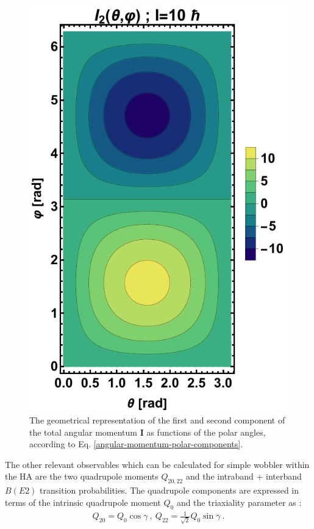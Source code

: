 \begin{figure}
    \includegraphics[scale=0.66]{Chapters/Figures/angular_components-TRM-2.pdf}
    \caption{The geometrical representation of the first and second component of the total angular momentum $\mathbf{I}$ as functions of the polar angles, according to Eq. \ref{angular-momentum-polar-components}.}
    \label{figs-angular-momentum-components-polar}
\end{figure}

The other relevant observables which can be calculated for simple wobbler within the HA are the two quadrupole moments $Q_{20,22}$ and the intraband + interband $B(E2)$ transition probabilities. The quadrupole components are expressed in terms of the intrinsic quadrupole moment $Q_0$ and the triaxiality parameter as \cite{shoji2006microscopic}:
\begin{align}
    Q_{20}=Q_0\cos\gamma\ ,\ Q_{22}=\frac{1}{\sqrt{2}}Q_0\sin\gamma\ .
    \label{quadrupole-components-q20-q22}
\end{align}

